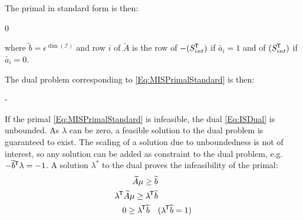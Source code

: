 The primal in standard form is then:
\begin{maxi!}
    {\scriptstyle \mu}{0}{\label{Eq:MISPrimalStandard}}{} 
\end{maxi!}
where $\widetilde{b} = \epsilon^{\dim(\mathcal{I})}$ and row $i$ of $\widetilde{A}$ is the row of $-(S_{int} ^{\mkern-1.5mu\mathsf{T}})$ if $\widetilde{a_i} = 1$ and of $(S_{int} ^{\mkern-1.5mu\mathsf{T}})$ if $\widetilde{a_i} = 0$. 




The dual problem corresponding to \cref{Eq:MISPrimalStandard} is then: 
\begin{mini!}
    {\scriptstyle \lambda}{-  \tran \lambda}{\label{Eq:ISDual}}{} 
\end{mini!}

If the primal \cref{Eq:MISPrimalStandard} is infeasible, the dual \cref{Eq:ISDual} is unbounded. As $\lambda$ can be zero, a feasible solution to the dual problem is guaranteed to exist. The scaling of a solution due to unboundedness is not of interest, so any solution can be added as constraint to the dual problem, e.g. $-\widetilde{b} ^{\mkern-1.5mu\mathsf{T}} \lambda = -1$. A solution $\lambda^*$ to the dual proves the infeasibility of the primal:
\begin{align*}
    \widetilde{A} \mu \geq \widetilde{b} &\\
    \lambda ^{\mkern-1.5mu\mathsf{T}} \widetilde{A} \mu \geq \lambda ^{\mkern-1.5mu\mathsf{T}} \widetilde{b} &\\
    0 \geq \lambda ^{\mkern-1.5mu\mathsf{T}} \widetilde{b} \quad &(\lambda ^{\mkern-1.5mu\mathsf{T}} \widetilde{b} = 1)
\end{align*}

